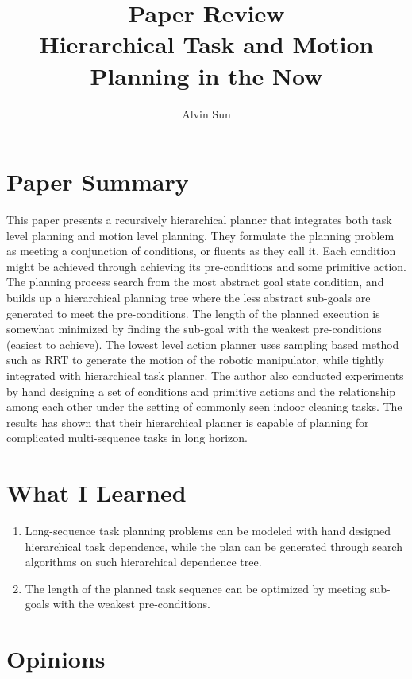 \documentclass[10pt, twocolumn]{article}
\title{\vspace{-3.0em}Paper Review\\Hierarchical Task and Motion Planning in the Now}
\author{Alvin Sun}
\begin{document}
\maketitle

\section{Paper Summary}
This paper presents a recursively hierarchical planner that integrates both
task level planning and motion level planning. They formulate the planning
problem as meeting a conjunction of conditions, or fluents as they call it.
Each condition might be achieved through achieving its pre-conditions and
some primitive action. The planning process search from the most abstract goal
state condition, and builds up a hierarchical planning tree where
the less abstract sub-goals are generated to meet the pre-conditions. The length
of the planned execution is somewhat minimized by finding the sub-goal with
the weakest pre-conditions (easiest to achieve). The lowest level
action planner uses sampling based method such as RRT to generate the motion
of the robotic manipulator, while tightly integrated with hierarchical
task planner. The author also conducted experiments by hand designing a set
of conditions and primitive actions and the relationship among each other under the setting of
commonly seen indoor cleaning tasks. The results has shown that their
hierarchical planner is capable of planning for complicated multi-sequence
tasks in long horizon.

\section{What I Learned}
\begin{enumerate}
  \item Long-sequence task planning problems can be modeled with hand
    designed hierarchical task dependence, while the plan can be generated
    through search algorithms on such hierarchical dependence tree.

  \item The length of the planned task sequence can be optimized by
    meeting sub-goals with the weakest pre-conditions.
\end{enumerate}

\section{Opinions}
\end{document}
